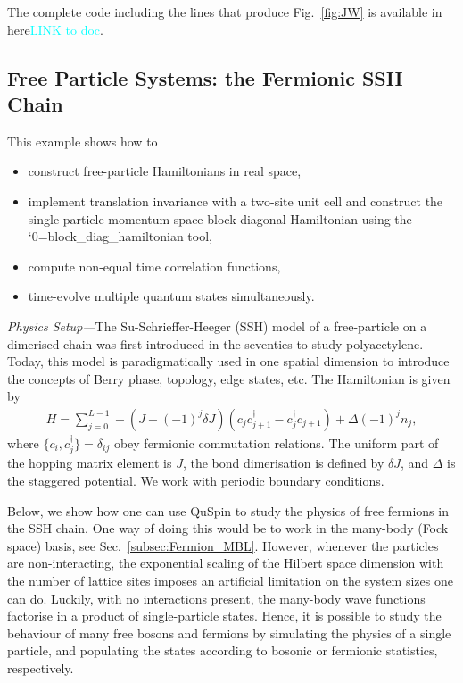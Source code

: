 \documentclass{SciPost}
\newcommand\0{\scalebox{-1}[1]{0}}
\let\svttfamily\ttfamily
\renewcommand\ttfamily{\svttfamily\catcode`0=\active }
\renewcommand\texttt{\bgroup\ttfamily\texttthelp}
\def\texttthelp#1{#1\egroup}
\newcommand*{\cyan}{\textcolor{cyan}}
\begin{document}
The complete code including the lines that produce Fig.~\ref{fig:JW} is available in here\cyan{LINK to doc}.



\subsection{Free Particle Systems: the Fermionic SSH Chain}

\label{subsec:SSH_model}

This example shows how to
\begin{itemize}
	\item construct free-particle Hamiltonians in real space,
	\item implement translation invariance with a two-site unit cell and construct the single-particle momentum-space block-diagonal Hamiltonian using the \texttt{block\_diag\_hamiltonian} tool,
	\item compute non-equal time correlation functions,
	\item time-evolve multiple quantum states simultaneously.
\end{itemize}

\noindent\emph{Physics Setup---}The Su-Schrieffer-Heeger (SSH) model of a free-particle on a dimerised chain was first introduced in the seventies to study polyacetylene. Today, this model is paradigmatically used in one spatial dimension to introduce the concepts of Berry phase, topology, edge states, etc. The Hamiltonian is given by
\begin{eqnarray}
H = \sum_{j=0}^{L-1} -(J+(-1)^j\delta J)\left(c_jc^\dagger_{j+1} - c^\dagger_{j}c_{j+1}\right) + \Delta(-1)^jn_j, 
\label{eq:SSH}
\end{eqnarray}
where $\{c_i,c^\dagger_j\}=\delta _{ij}$ obey fermionic commutation relations. The uniform part of the hopping matrix element is $J$, the bond dimerisation is defined by $\delta J$, and $\Delta$ is the staggered potential. We work with periodic boundary conditions.

Below, we show how one can use QuSpin to study the physics of free fermions in the SSH chain. One way of doing this would be to work in the many-body (Fock space) basis, see Sec.~\ref{subsec:Fermion_MBL}. However, whenever the particles are non-interacting, the exponential scaling of the Hilbert space dimension with the number of lattice sites imposes an artificial limitation on the system sizes one can do. Luckily, with no interactions present, the many-body wave functions factorise in a product of single-particle states. Hence, it is possible to study the behaviour of many free bosons and fermions by simulating the physics of a single particle, and populating the states according to bosonic or fermionic statistics, respectively.
\end{document}
